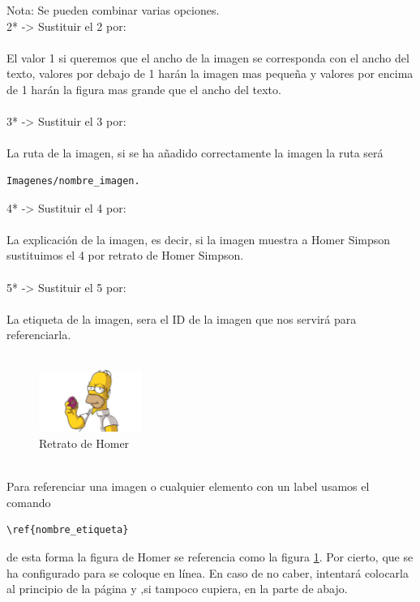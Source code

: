 Nota: Se pueden combinar varias opciones.
\\
2* -> Sustituir el 2 por:\\
\\
El valor 1 si queremos que el ancho de la imagen se corresponda con el ancho del texto, valores por debajo de 1 harán la imagen mas pequeña y valores por encima de 1 harán la figura mas grande que el ancho del texto.\\
\\
3* -> Sustituir el 3 por:\\
\\
La ruta de la imagen, si se ha añadido correctamente la imagen la ruta será \begin{verbatim}
Imagenes/nombre_imagen.
\end{verbatim}
4* -> Sustituir el 4 por:\\
\\
La explicación de la imagen, es decir, si la imagen muestra a Homer Simpson sustituimos el 4 por retrato de Homer Simpson.\\
\\
5* -> Sustituir el 5 por:\\
\\
La etiqueta de la imagen, sera el ID de la imagen que nos servirá para referenciarla.\\
\\
\begin{figure}[!htb]
	\centering
   \includegraphics[width=0.3\textwidth]{Imagenes/homer.jpg}
  \caption{Retrato de Homer}
  \label{fig:Homer}
\end{figure}
\\
Para referenciar una imagen o cualquier elemento con un label usamos el comando \begin{verbatim}\ref{nombre_etiqueta}\end{verbatim} de esta forma la figura de Homer se referencia como la figura \ref{fig:Homer}. Por cierto, que se ha configurado para se coloque en línea. En caso de no caber, intentará colocarla al principio de la página y ,si tampoco cupiera, en la parte de abajo.





